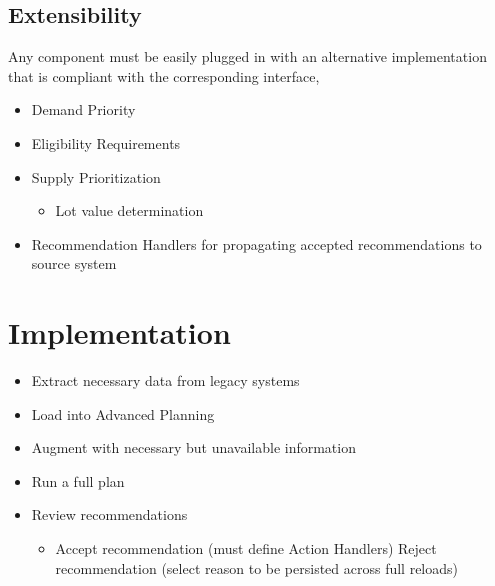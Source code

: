 \documentclass[letterpaper,10pt,english]{sphinxmanual}
\begin{document}
\section{Extensibility}
\label{BusinessProcessReengineering:id13}
Any component must be easily plugged in with an alternative
implementation that is compliant with the corresponding interface,
\begin{itemize}
\item {} 
Demand Priority

\item {} 
Eligibility Requirements

\item {} 
Supply Prioritization
\begin{itemize}
\item {} 
Lot value determination

\end{itemize}

\item {} 
Recommendation Handlers for propagating accepted recommendations to
source system

\end{itemize}


\chapter{Implementation}
\label{BusinessProcessReengineering:id14}\begin{itemize}
\item {} 
Extract necessary data from legacy systems

\item {} 
Load into Advanced Planning

\item {} 
Augment with necessary but unavailable information

\item {} 
Run a full plan

\item {} 
Review recommendations
\begin{itemize}
\item {} 
Accept recommendation (must define Action Handlers) Reject
recommendation (select reason to be persisted across full reloads)

\end{itemize}

\end{itemize}
\end{document}
